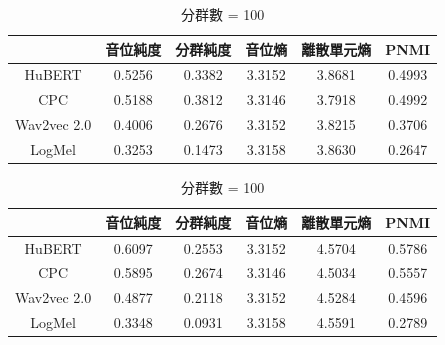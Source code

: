 {


\begin{table}[!htbp]
    \centering
    \begin{subtable}[t]{\textwidth}
        \centering
        \begin{tabular}{|c|c|c|c|c|c|} \hline
                        & 音位純度   & 分群純度   & 音位熵    & 離散單元熵  & PNMI   \\ \hline
            HuBERT      &     0.5256 &     0.3382 &    3.3152 &      3.8681 & 0.4993 \\ \hline    %
            CPC         &     0.5188 &     0.3812 &    3.3146 &      3.7918 & 0.4992 \\ \hline    %
            Wav2vec 2.0 &     0.4006 &     0.2676 &    3.3152 &      3.8215 & 0.3706 \\ \hline    %
            LogMel      &     0.3253 &     0.1473 &    3.3158 &      3.8630 & 0.2647 \\ \hline    %
        \end{tabular}
        \caption{分群數 = 50}
        \label{tab:ch3-clu050-phn}
    \end{subtable}

    \vspace{0.5cm}

    \begin{subtable}[t]{\textwidth}
        \centering
        \begin{tabular}{|c|c|c|c|c|c|} \hline
                        & 音位純度   & 分群純度   & 音位熵    & 離散單元熵  & PNMI   \\ \hline
            HuBERT      &     0.6097 &     0.2553 &    3.3152 &      4.5704 & 0.5786 \\ \hline    %
            CPC         &     0.5895 &     0.2674 &    3.3146 &      4.5034 & 0.5557 \\ \hline    %
            Wav2vec 2.0 &     0.4877 &     0.2118 &    3.3152 &      4.5284 & 0.4596 \\ \hline    %
            LogMel      &     0.3348 &     0.0931 &    3.3158 &      4.5591 & 0.2789 \\ \hline    %
        \end{tabular}
        \caption{分群數 = 100}
        \label{tab:ch3-clu100-phn}
    \end{subtable}

    \vspace{0.5cm}


\end{table}}
